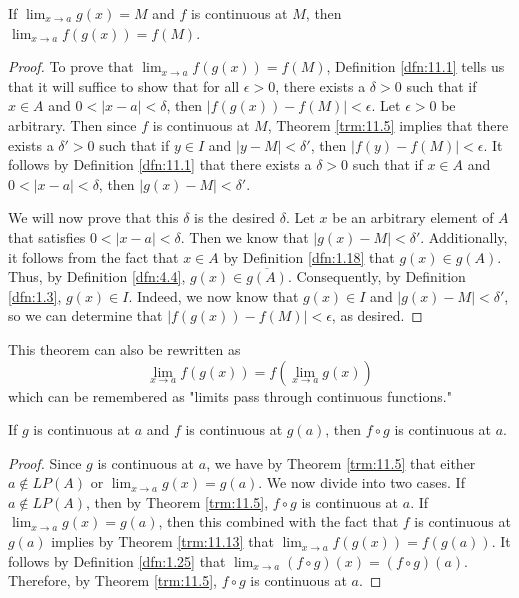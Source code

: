 \documentclass[../main.tex]{subfiles}
\begin{document}
\begin{theorem}\label{trm:11.13}
    If $\lim_{x\to a}g(x)=M$ and $f$ is continuous at $M$, then $\lim_{x\to a}f(g(x))=f(M)$.
    \begin{proof}
        To prove that $\lim_{x\to a}f(g(x))=f(M)$, Definition \ref{dfn:11.1} tells us that it will suffice to show that for all $\epsilon>0$, there exists a $\delta>0$ such that if $x\in A$ and $0<|x-a|<\delta$, then $|f(g(x))-f(M)|<\epsilon$. Let $\epsilon>0$ be arbitrary. Then since $f$ is continuous at $M$, Theorem \ref{trm:11.5} implies that there exists a $\delta'>0$ such that if $y\in I$ and $|y-M|<\delta'$, then $|f(y)-f(M)|<\epsilon$. It follows by Definition \ref{dfn:11.1} that there exists a $\delta>0$ such that if $x\in A$ and $0<|x-a|<\delta$, then $|g(x)-M|<\delta'$.\par
        We will now prove that this $\delta$ is the desired $\delta$. Let $x$ be an arbitrary element of $A$ that satisfies $0<|x-a|<\delta$. Then we know that $|g(x)-M|<\delta'$. Additionally, it follows from the fact that $x\in A$ by Definition \ref{dfn:1.18} that $g(x)\in g(A)$. Thus, by Definition \ref{dfn:4.4}, $g(x)\in\overline{g(A)}$. Consequently, by Definition \ref{dfn:1.3}, $g(x)\in I$. Indeed, we now know that $g(x)\in I$ and $|g(x)-M|<\delta'$, so we can determine that $|f(g(x))-f(M)|<\epsilon$, as desired.
    \end{proof}
\end{theorem}

\begin{remark}\label{rmk:11.14}
    This theorem can also be rewritten as
    \begin{equation*}
        \lim_{x\to a}f(g(x)) = f\left( \lim_{x\to a}g(x) \right)
    \end{equation*}
    which can be remembered as "limits pass through continuous functions."
\end{remark}

\begin{corollary}\label{cly:11.15}
    If $g$ is continuous at $a$ and $f$ is continuous at $g(a)$, then $f\circ g$ is continuous at $a$.
    \begin{proof}
        Since $g$ is continuous at $a$, we have by Theorem \ref{trm:11.5} that either $a\notin LP(A)$ or $\lim_{x\to a}g(x)=g(a)$. We now divide into two cases. If $a\notin LP(A)$, then by Theorem \ref{trm:11.5}, $f\circ g$ is continuous at $a$. If $\lim_{x\to a}g(x)=g(a)$, then this combined with the fact that $f$ is continuous at $g(a)$ implies by Theorem \ref{trm:11.13} that $\lim_{x\to a}f(g(x))=f(g(a))$. It follows by Definition \ref{dfn:1.25} that $\lim_{x\to a}(f\circ g)(x)=(f\circ g)(a)$. Therefore, by Theorem \ref{trm:11.5}, $f\circ g$ is continuous at $a$.
    \end{proof}
\end{corollary}
\end{document}

